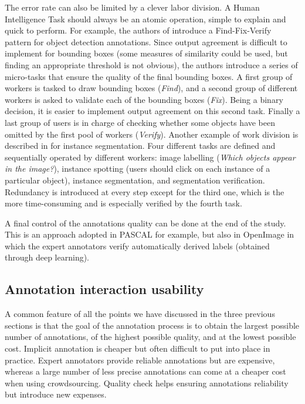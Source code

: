 The error rate can also be limited by a clever labor division. A Human Intelligence Task should always be an atomic operation, simple to explain and quick to perform. For example, the authors of \cite{su2012crowdsourcing} introduce a Find-Fix-Verify pattern for object detection annotations. Since output agreement is difficult to implement for bounding boxes (some measures of similarity could be used, but finding an appropriate threshold is not obvious), the authors introduce a series of micro-tasks that ensure the quality of the final bounding boxes. A first group of workers is tasked to draw bounding boxes (\textit{Find}), and a second group of different  workers is asked to validate each of the bounding boxes (\textit{Fix}). Being a binary decision, it is easier to implement output agreement on this second task. Finally a last group of users is in charge of checking whether some objects have been omitted by the first pool of workers (\textit{Verify}). Another example of work division is described in \cite{chen2015microsoft} for instance segmentation. Four different tasks are defined and sequentially operated by different workers: image labelling (\textit{Which objects appear in the image?}), instance spotting (users should click on each instance of a particular object), instance segmentation, and segmentation verification. Redundancy is introduced at every step except for the third one, which is the more time-consuming and is especially verified by the fourth task.  


A final control of the annotations quality can be done at the end of the study. This is an approach adopted in PASCAL \cite{Everingham10} for example, but also in OpenImage \cite{OpenImages} in which the expert annotators verify automatically derived labels (obtained through deep learning). 


\subsection{Annotation interaction usability}

A common feature of all the points we have discussed in the three previous sections is that the goal of the annotation process is to obtain the largest possible number of annotations, of the highest possible quality, and at the lowest possible cost. Implicit annotation is cheaper but often difficult to put into place in practice. Expert annotators provide reliable annotations but are expensive, whereas a large number of less precise annotations can come at a cheaper cost when using crowdsourcing. Quality check helps ensuring annotations reliability but introduce new expenses. 


